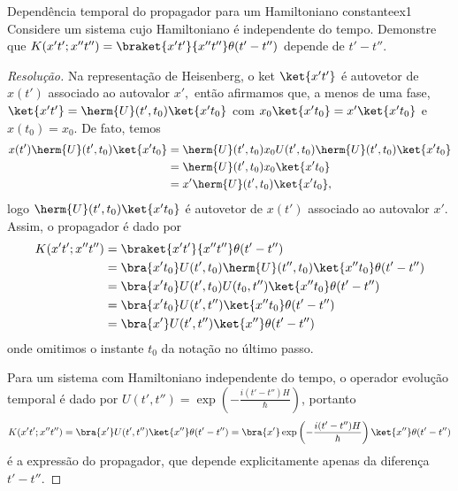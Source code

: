 \begin{exercício}{Dependência temporal do propagador para um Hamiltoniano constante}{ex1}
   Considere um sistema cujo Hamiltoniano é independente do tempo. Demonstre que \(K(x't'; x''t'') = \braket{x't'}{x''t''}\theta(t' - t'')\) depende de \(t' - t''.\)
\end{exercício}
\begin{proof}[Resolução]
   Na representação de Heisenberg, o ket \(\ket{x't'}\) é autovetor de \(x(t')\) associado ao autovalor \(x',\) então afirmamos que, a menos de uma fase, \(\ket{x't'} = \herm{U}(t',t_0)\ket{x't_0}\) com \(x_0 \ket{x' t_0} = x' \ket{x' t_0}\) e \(x(t_0) = x_0.\) De fato, temos
   \begin{align*}
      x(t') \herm{U}(t', t_0) \ket{x' t_0} &= \herm{U}(t', t_0) x_0 U(t',t_0) \herm{U}(t', t_0)\ket{x' t_0}\\
                                           &= \herm{U}(t', t_0) x_0\ket{x' t_0}\\
                                           &= x' \herm{U}(t', t_0) \ket{x' t_0},
   \end{align*}
   logo \(\herm{U}(t', t_0) \ket{x' t_0}\) é autovetor de \(x(t')\) associado ao autovalor \(x'\). Assim, o propagador é dado por
   \begin{align*}
      K(x' t'; x''t'') &= \braket{x't'}{x'' t''} \theta(t' - t'')\\
                       &= \bra{x't_0}U(t', t_0)\herm{U}(t'', t_0)\ket{x''t_0} \theta(t' - t'')\\
                       &= \bra{x't_0}U(t', t_0) U(t_0, t'') \ket{x''t_0} \theta(t' - t'')\\
                       &= \bra{x't_0} U(t', t'') \ket{x''t_0} \theta(t' - t'')\\
                       &= \bra{x'} U(t', t'') \ket{x''} \theta(t' - t'')
   \end{align*}
   onde omitimos o instante \(t_0\) da notação no último passo.

   Para um sistema com Hamiltoniano independente do tempo, o operador evolução temporal é dado por \(U(t', t'') = \exp\left(-\frac{i (t' - t'') H}{\hbar}\right)\), portanto
   \begin{equation*}
      K(x't'; x''t'') = \bra{x'}U(t', t'')\ket{x''} \theta(t' - t'') = \bra{x'} \exp\left(-\frac{i (t' - t'') H}{\hbar}\right) \ket{x''} \theta(t' - t'')
   \end{equation*}
   é a expressão do propagador, que depende explicitamente apenas da diferença \(t' - t''.\)
\end{proof}
